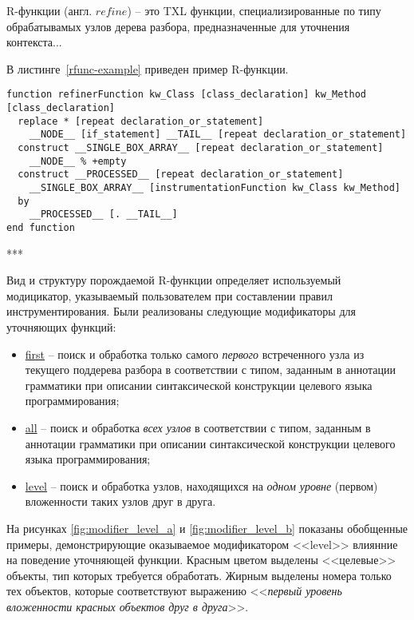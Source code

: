 R-функции (англ. $refine$) -- это TXL функции, специализированные по типу обрабатывамых узлов дерева разбора, предназначенные для уточнения контекста...

В листинге~\ref{rfunc-example} приведен пример R-функции.

\begin{lstlisting}[frame=single, language=TXL, label={rfunc-example}, caption={Пример R-функции}]
function refinerFunction kw_Class [class_declaration] kw_Method [class_declaration]
  replace * [repeat declaration_or_statement]
    __NODE__ [if_statement] __TAIL__ [repeat declaration_or_statement]
  construct __SINGLE_BOX_ARRAY__ [repeat declaration_or_statement]
    __NODE__ % +empty
  construct __PROCESSED__ [repeat declaration_or_statement]
    __SINGLE_BOX_ARRAY__ [instrumentationFunction kw_Class kw_Method]
  by
    __PROCESSED__ [. __TAIL__]
end function
\end{lstlisting}

***

Вид и структуру порождаемой R-функции определяет используемый модицикатор, указываемый пользователем при составлении правил инструментирования.
Были реализованы следующие модификаторы для уточняющих функций:

\begin{itemize}[noitemsep]
  \item \underline{first} -- поиск и обработка только самого \textit{первого} встреченного узла из текущего поддерева разбора в соответствии с типом, заданным в аннотации грамматики при описании синтаксической конструкции целевого языка программирования;
  \item \underline{all}   -- поиск и обработка \textit{всех узлов} в соответствии с типом, заданным в аннотации грамматики при описании синтаксической конструкции целевого языка программирования;
  \item \underline{level} -- поиск и обработка узлов, находящихся на \textit{одном уровне} (первом) вложенности таких узлов друг в друга.
\end{itemize}

На рисунках \ref{fig:modifier_level_a} и \ref{fig:modifier_level_b} показаны обобщенные примеры, демонстрирующие оказываемое модификатором <<level>> влиянние на поведение уточняющей функции.
Красным цветом выделены <<целевые>> объекты, тип которых требуется обработать.
Жирным выделены номера только тех объектов, которые соответствуют выражению <<\textit{первый уровень вложенности красных объектов друг в друга}>>.

